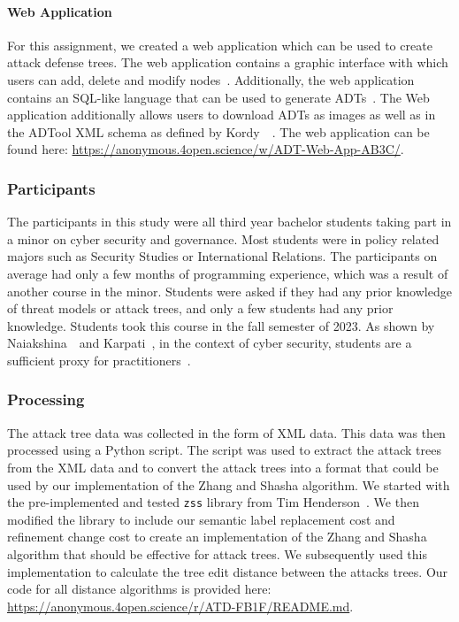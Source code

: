 \paragraph{Web Application}

For this assignment, we created a web application which can be used to create attack defense trees. The web application contains a graphic interface with which users can add, delete and modify nodes~\cite{mohalaiaImplementingUserInterface2023}. Additionally, the web application contains an SQL-like language that can be used to generate ADTs~\cite{mezaADTLangDeclarativeLanguage2023}. The Web application additionally allows users to download ADTs as images as well as in the ADTool XML schema as defined by Kordy~\etal~\cite{kordy_adtool_2013}. The web application can be found here: \url{https://anonymous.4open.science/w/ADT-Web-App-AB3C/}.

\subsubsection{Participants}
The participants in this study were all third year bachelor students taking part in a minor on cyber security and governance. Most students were in policy related majors such as Security Studies or International Relations. The participants on average had only a few months of programming experience, which was a result of another course in the minor. Students were asked if they had any prior knowledge of threat models or attack trees, and only a few students had any prior knowledge. Students took this course in the fall semester of 2023. As shown by Naiakshina~\etal\ and Karpati~\etal, in the context of cyber security, students are a sufficient proxy for practitioners~\cite{karpatiComparingAttackTrees2014, naiakshinaConductingSecurityDeveloper2020}.



\subsubsection{Processing}

The attack tree data was collected in the form of XML data. This data was then processed using a Python script. The script was used to extract the attack trees from the XML data and to convert the attack trees into a format that could be used by our implementation of the Zhang and Shasha algorithm. We started with the pre-implemented and tested \texttt{zss} library from Tim Henderson~\cite{hendersonZssTreeEdit}. We then modified the library to include our semantic label replacement cost and refinement change cost to create an implementation of the Zhang and Shasha algorithm that should be effective for attack trees. We subsequently used this implementation to calculate the tree edit distance between the attacks trees. Our code for all distance algorithms is provided here: \url{https://anonymous.4open.science/r/ATD-FB1F/README.md}.


